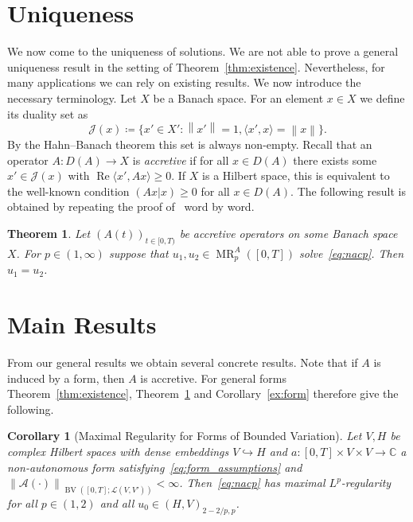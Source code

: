 \documentclass[reqno,a4paper,final]{amsart}
\numberwithin{equation}{section}
\newtheorem{corollary}[lemma]{Corollary}
\newtheorem{theorem}[lemma]{Theorem}
\theoremstyle{definition}
\begin{document}
\section{Uniqueness}

	We now come to the uniqueness of solutions. We are not able to prove a general uniqueness result in the setting of Theorem~\ref{thm:existence}. Nevertheless, for many applications we can rely on existing results. We now introduce the necessary terminology. Let $X$ be a Banach space. For an element $x \in X$ we define its duality set as
	\begin{equation*}
		\mathcal{J}(x) \coloneqq \{ x' \in X': {\left\lVert{x'}\right\rVert} = 1, \langle x', x \rangle = {\left\lVert{x}\right\rVert} \}.
	\end{equation*}
	By the Hahn--Banach theorem this set is always non-empty. Recall that an operator $A\colon D(A) \to X$ is \emph{accretive} if for all $x \in D(A)$ there exists some $x' \in \mathcal{J}(x)$ with ${\operatorname{Re}} \langle x', Ax \rangle \ge 0$. If $X$ is a Hilbert space, this is equivalent to the well-known condition $(Ax|x) \ge 0$ for all $x \in D(A)$. The following result is obtained by repeating the proof of~\cite[Proposition~3.2]{ACFP07} word by word.

	\begin{theorem}\label{thm:uniqueness}
		Let $(A(t))_{t \in [0,T)}$ be accretive operators on some Banach space $X$. For $p \in (1, \infty)$ suppose that $u_1, u_2 \in \operatorname{MR}_p^A([0,T])$ solve~\eqref{eq:nacp}. Then $u_1  = u_2$.
	\end{theorem}
	
\section{Main Results}
	
	From our general results we obtain several concrete results. Note that if $A$ is induced by a form, then $A$ is accretive. For general forms Theorem~\ref{thm:existence}, Theorem~\ref{thm:uniqueness} and Corollary~\ref{ex:form} therefore give the following.
	
	\begin{corollary}[Maximal Regularity for Forms of Bounded Variation]\label{cor:elliptic_operator}
		Let $V, H$ be complex Hilbert spaces with dense embeddings $V \hookrightarrow H$ and $a\colon [0,T] \times V \times V \to {\mathbb{C}}$ a non-autonomous form satisfying~\eqref{eq:form_assumptions} and ${\left\lVert{\mathcal{A}(\cdot)}\right\rVert}_{\operatorname{BV}([0,T];\mathcal{L}(V,V'))} < \infty$. Then~\eqref{eq:nacp} has maximal $L^p$-regularity for all $p \in (1, 2)$ and all $u_0 \in (H,V)_{2-2/p,p}$.
	\end{corollary}
	
\end{document}
